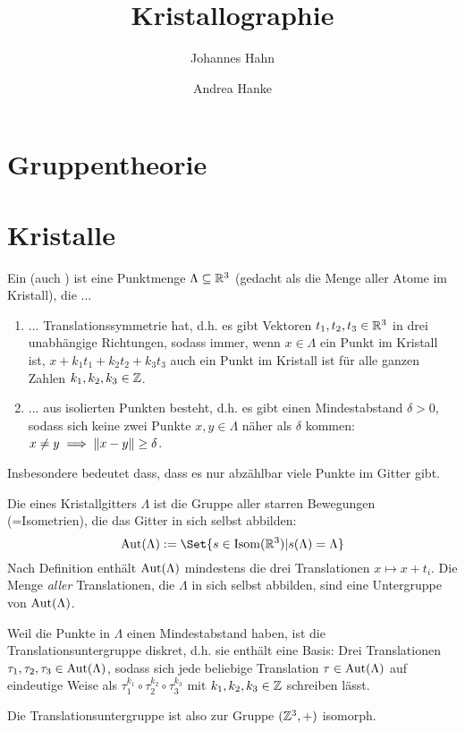 \documentclass[fontsize=11pt,fleqn,a4paper]{scrartcl}
\title{Kristallographie}
\author{Johannes Hahn \and Andrea Hanke}
\begin{document}
\maketitle

\section{Gruppentheorie}

\section{Kristalle}

\begin{definition}[Kristalle]
Ein  (auch ) ist eine Punktmenge $\Lambda\subseteq\mathbb{R}^3$ (gedacht als die Menge aller Atome im Kristall), die ...
\begin{enumerate}
\item ... Translationssymmetrie hat, d.h. es gibt Vektoren $t_1,t_2,t_3\in\mathbb{R}^3$ in drei unabhängige Richtungen, sodass immer, wenn $x\in\Lambda$ ein Punkt im Kristall ist, $x+k_1 t_1+k_2t_2+k_3t_3$ auch ein Punkt im Kristall ist für alle ganzen Zahlen $k_1,k_2,k_3\in\mathbb{Z}$.
\item ... aus isolierten Punkten besteht, d.h. es gibt einen Mindestabstand $\delta>0$, sodass sich keine zwei Punkte $x,y\in\Lambda$ näher als $\delta$ kommen: $x\neq y \implies\lVert x-y\rVert\geq\delta$.
\end{enumerate}
\end{definition}

\begin{remark}
Insbesondere bedeutet dass, dass es nur abzählbar viele Punkte im Gitter gibt.
\end{remark}

\begin{definition}
Die  eines Kristallgitters $\Lambda$ ist die Gruppe aller starren Bewegungen (=Isometrien), die das Gitter in sich selbst abbilden:
\[\Aut(\Lambda) := \Set{s\in \operatorname{Isom}(\IR^3) | s(\Lambda)=\Lambda}\]
Nach Definition enthält $\operatorname{Aut}(\Lambda)$ mindestens die drei Translationen $x\mapsto x+t_i$. Die Menge \emph{aller} Translationen, die $\Lambda$ in sich selbst abbilden, sind eine Untergruppe von $\operatorname{Aut}(\Lambda)$.
\end{definition}

\begin{remark}
Weil die Punkte in $\Lambda$ einen Mindestabstand haben, ist die Translationsuntergruppe diskret, d.h. sie enthält eine Basis: Drei Translationen $\tau_1,\tau_2,\tau_3\in\operatorname{Aut}(\Lambda)$, sodass sich jede beliebige Translation $\tau\in\operatorname{Aut}(\Lambda)$ auf eindeutige Weise als $\tau_1^{k_1}\circ\tau_2^{k_2} \circ \tau_3^{k_3}$ mit $k_1,k_2,k_3\in\mathbb{Z}$ schreiben lässt.

Die Translationsuntergruppe ist also zur Gruppe $(\mathbb{Z}^3,+)$ isomorph.
\end{remark}
\end{document}
